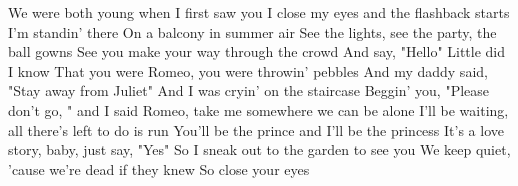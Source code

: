 \documentclass[12pt]{article}
\begin{document}
We were both young when I first saw you
I close my eyes and the flashback starts
I'm standin' there
On a balcony in summer air
See the lights, see the party, the ball gowns
See you make your way through the crowd
And say, "Hello"
Little did I know
That you were Romeo, you were throwin' pebbles
And my daddy said, "Stay away from Juliet"
And I was cryin' on the staircase
Beggin' you, "Please don't go, " and I said
Romeo, take me somewhere we can be alone
I'll be waiting, all there's left to do is run
You'll be the prince and I'll be the princess
It's a love story, baby, just say, "Yes"
So I sneak out to the garden to see you
We keep quiet, 'cause we're dead if they knew
So close your eyes
\end{document}
